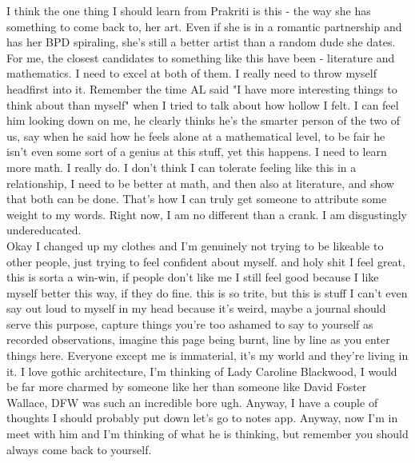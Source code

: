 \noindent {}

I think the one thing I should learn from Prakriti is this - the way she has something to come back to, her art. Even if she is in a romantic partnership and has her BPD spiraling, she's still a better artist than a random dude she dates. For me, the closest candidates to something like this have been - literature and mathematics. I need to excel at both of them. I really need to throw myself headfirst into it. Remember the time AL said "I have more interesting things to think about than myself" when I tried to talk about how hollow I felt. I can feel him looking down on me, he clearly thinks he's the smarter person of the two of us, say when he said how he feels alone at a mathematical level, to be fair he isn't even some sort of a genius at this stuff, yet this happens. I need to learn more math. I really do. I don't think I can tolerate feeling like this in a relationship, I need to be better at math, and then also at literature, and show that both can be done. That's how I can truly get someone to attribute some weight to my words. Right now, I am no different than a crank. I am disgustingly undereducated.\\

Okay I changed up my clothes and I'm genuinely not trying to be likeable to other people, just trying to feel confident about myself. and holy shit I feel great, this is sorta a win-win, if people don't like me I still feel good because I like myself better this way, if they do fine. this is so trite, but this is stuff I can't even say out loud to myself in my head because it's weird, maybe a journal should serve this purpose, capture things you're too ashamed to say to yourself as recorded observations, imagine this page being burnt, line by line as you enter things here. Everyone except me is immaterial, it's my world and they're living in it. I love gothic architecture, I'm thinking of Lady Caroline Blackwood, I would be far more charmed by someone like her than someone like David Foster Wallace, DFW was such an incredible bore ugh. Anyway, I have a couple of thoughts I should probably put down let's go to notes app. Anyway, now I'm in meet with him and I'm thinking of what he is thinking, but remember you should always come back to yourself. 